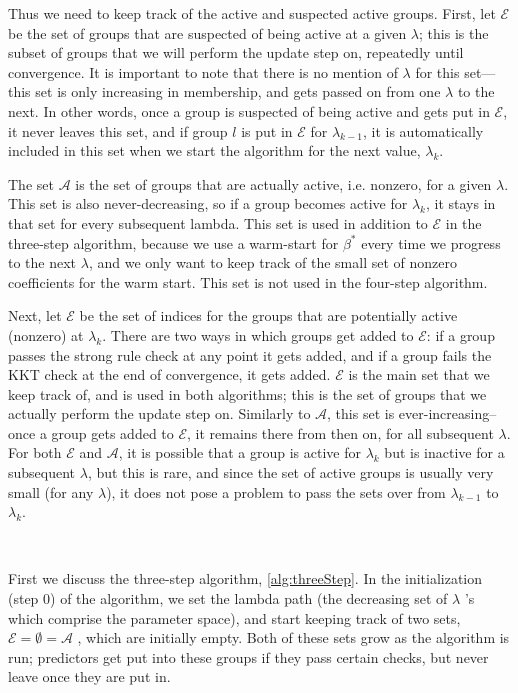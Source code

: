 \documentclass[12pt]{article}
\begin{document}
Thus we need to keep track of the active and suspected active groups. First, let $\mathcal{E}$ be the set of groups that are suspected of being active at a given $\lambda$; this is the subset of groups that we will perform the update step on, repeatedly until convergence. It is important to note that there is no mention of $\lambda$ for this set---this set is only increasing in membership, and gets passed on from one $\lambda$ to the next. In other words, once a group is suspected of being active and gets put in $\mathcal{E}$, it never leaves this set, and if group $l$ is put in $\mathcal{E}$ for $\lambda_{k-1}$, it is automatically included in this set when we start the algorithm for the next value, $\lambda_k$. 

The set $\mathcal{A}$ is the set of groups that are actually active, i.e. nonzero, for a given $\lambda$. This set is also never-decreasing, so if a group becomes active for $\lambda_k$, it stays in that set for every subsequent lambda. This set is used in addition to $\mathcal{E}$ in the three-step algorithm, because we use a warm-start for $\beta^*$ every time we progress to the next $\lambda$, and we only want to keep track of the small set of nonzero coefficients for the warm start. This set is not used in the four-step algorithm.

Next, let $\mathcal{E}$ be the set of indices for the groups that are potentially active (nonzero) at $\lambda_k$. There are two ways in which groups get added to $\mathcal{E}$: if a group passes the strong rule check at any point it gets added, and if a group fails the KKT check at the end of convergence, it gets added. $\mathcal{E}$ is the main set that we keep track of, and is used in both algorithms; this is the set of groups that we actually perform the update step on. Similarly to $\mathcal{A}$, this set is ever-increasing--once a group gets added to $\mathcal{E}$, it remains there from then on, for all subsequent $\lambda$. For both $\mathcal{E}$ and $\mathcal{A}$, it is possible that a group is active for $\lambda_{k}$ but is inactive for a subsequent $\lambda$, but this is rare, and since the set of active groups is usually very small (for any $\lambda$), it does not pose a problem to pass the sets over from $\lambda_{k-1}$ to $\lambda_k$.

\

First we discuss the three-step algorithm, \autoref{alg:threeStep}. In the initialization (step 0) of the algorithm, we set the lambda path (the decreasing set of $\lambda$ 's which comprise the parameter space), and start keeping track of two sets, $\mathcal{E} = \emptyset = \mathcal{A}$ , which are initially empty. Both of these sets grow as the algorithm is run; predictors get put into these groups if they pass certain checks, but never leave once they are put in.
\end{document}
